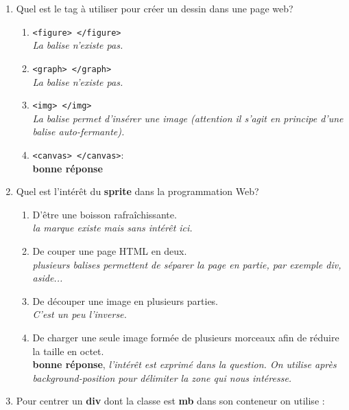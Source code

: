 \documentclass[]{scrartcl}
\begin{document}
\begin{enumerate}
    \item Quel est le tag à utiliser pour créer un dessin dans une page web?
    \begin{enumerate}
        \item \verb?<figure> </figure>?\\ \textit{La balise n'existe pas.}
        \item \verb?<graph> </graph>?\\ \textit{La balise n'existe pas.}
        \item \verb?<img> </img>? \\ \textit{La balise  permet d'insérer une image (attention il s'agit en principe d'une balise auto-fermante).}
        \item \verb?<canvas> </canvas>?: \\ \textbf{bonne réponse}
    \end{enumerate}
    \item Quel est l'intérêt du \textbf{sprite} dans la programmation Web?
    \begin{enumerate}
        \item D'être une boisson rafraîchissante. \\ \textit{ la marque existe mais sans intérêt ici.}
        \item De couper une page HTML en deux. \\ \textit{plusieurs balises permettent de séparer la page en partie, par exemple div, aside...}
        \item De découper une image en plusieurs parties.\\ \textit{C'est un peu l'inverse.}
        \item De charger une seule image formée de plusieurs morceaux afin de réduire la taille en octet.\\ \textbf{bonne réponse}, \textit{l'intérêt est exprimé dans la question. On utilise après background-position pour délimiter la zone qui nous intéresse.}
    \end{enumerate}
    \item Pour centrer un \textbf{div} dont la classe est \textbf{mb} dans son conteneur on utilise :
\end{enumerate}
\end{document}
